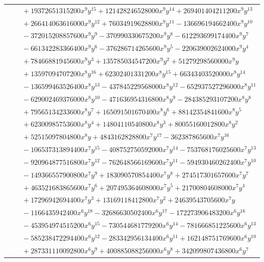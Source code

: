 \documentclass[11pt]{article}
\begin{document}
\begin{longtable}{@{}ll@{}}
 & $\quad +19372651315200x^{9}y^{15}+121428246528000x^{9}y^{14}+269401404211200x^{9}y^{13}$\\
 & $\quad +266414063616000x^{9}y^{12}+76034919628800x^{9}y^{11}-136696194662400x^{9}y^{10}$\\
 & $\quad -372015208857600x^{9}y^{9}-370990330675200x^{9}y^{8}-612293699174400x^{9}y^{7}$\\
 & $\quad -661342283366400x^{9}y^{6}-376286714265600x^{9}y^{5}-220639002624000x^{9}y^{4}$\\
 & $\quad +78466881945600x^{9}y^{3}+135785034547200x^{9}y^{2}+51279298560000x^{9}y$\\
 & $\quad +13597094707200x^{8}y^{16}+62302401331200x^{8}y^{15}+66343403520000x^{8}y^{14}$\\
 & $\quad -136599463526400x^{8}y^{13}-437845229568000x^{8}y^{12}-652937527296000x^{8}y^{11}$\\
 & $\quad -629002469376000x^{8}y^{10}-471636954316800x^{8}y^{9}-284385293107200x^{8}y^{8}$\\
 & $\quad +79565134233600x^{8}y^{7}+165091501670400x^{8}y^{6}+88142354841600x^{8}y^{5}$\\
 & $\quad +62300985753600x^{8}y^{4}+14804110540800x^{8}y^{3}+80055160012800x^{8}y^{2}$\\
 & $\quad +52515097804800x^{8}y+4843162828800x^{7}y^{17}-362387865600x^{7}y^{16}$\\
 & $\quad -106537313894400x^{7}y^{15}-408752750592000x^{7}y^{14}-753768176025600x^{7}y^{13}$\\
 & $\quad -920964877516800x^{7}y^{12}-762648566169600x^{7}y^{11}-594930460262400x^{7}y^{10}$\\
 & $\quad -149366557900800x^{7}y^{9}+183090570854400x^{7}y^{8}+274517301657600x^{7}y^{7}$\\
 & $\quad +463521683865600x^{7}y^{6}+207495364608000x^{7}y^{5}+21700804608000x^{7}y^{4}$\\
 & $\quad +17296942694400x^{7}y^{3}+13169118412800x^{7}y^{2}+24639543705600x^{7}y$\\
 & $\quad -1166435942400x^{6}y^{18}-32686630502400x^{6}y^{17}-172273906483200x^{6}y^{16}$\\
 & $\quad -453954974515200x^{6}y^{15}-730544681779200x^{6}y^{14}-781666851225600x^{6}y^{13}$\\
 & $\quad -585238472294400x^{6}y^{12}-283342956134400x^{6}y^{11}+162148751769600x^{6}y^{10}$\\
 & $\quad +287331110092800x^{6}y^{9}+400885088256000x^{6}y^{8}+342099807436800x^{6}y^{7}$\\

\end{longtable}
\end{document}
